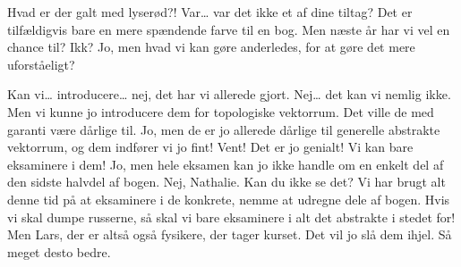 \documentclass[a4paper,11pt]{article}
\begin{document}
\begin{sketch}

 Hvad er der galt med lyserød?!
  Var… var det ikke et af dine tiltag?
  Det er tilfældigvis bare en mere spændende farve til en bog.
 Men næste år har vi vel en chance til? Ikk?
 Jo, men hvad vi kan gøre anderledes, for at gøre det mere uforståeligt?


 Kan vi… introducere… nej, det har vi allerede gjort.
 Nej… det kan vi nemlig ikke. Men vi kunne jo introducere dem for topologiske vektorrum.
Det ville de med garanti være dårlige til.
 Jo, men de er jo allerede dårlige til generelle abstrakte vektorrum, og dem indfører vi jo fint!
 Vent! Det er jo genialt! Vi kan bare eksaminere i dem!
 Jo, men hele eksamen kan jo ikke handle om en enkelt del af den sidste halvdel af bogen.
 Nej, Nathalie. Kan du ikke se det? Vi har brugt alt denne tid på at eksaminere i de konkrete,
nemme at udregne dele af bogen. Hvis vi skal dumpe russerne, så skal vi bare eksaminere i alt det abstrakte i stedet for!
 Men Lars, der er altså også fysikere, der tager kurset. Det vil jo slå dem ihjel.
 Så meget desto bedre.


\end{sketch}
\end{document}
